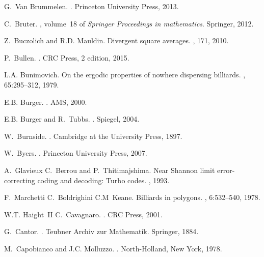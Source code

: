 \documentclass[12pt]{amsart}
\newcounter{example}    \def\example#1{ \item \fontsize{12}{15} \selectfont #1 \fontsize{12}{15} \selectfont }
\begin{document}
\begin{thebibliography}{100}
G.~Van Brummelen.
.
\newblock Princeton University Press, 2013.

C.~Bruter.
, volume~18 of {\em Springer
  Proceedings in mathematics}.
\newblock Springer, 2012.

Z.~Buczolich and R.D. Mauldin.
\newblock Divergent square averages.
, 171, 2010.

P.~Bullen.
.
\newblock CRC Press, 2 edition, 2015.

L.A. Bunimovich.
\newblock On the ergodic properties of nowhere dispersing billiards.
, 65:295--312, 1979.

E.B. Burger.
.
\newblock AMS, 2000.

E.B. Burger and R.~Tubbs.
.
\newblock Spiegel, 2004.

W.~Burnside.
.
\newblock Cambridge at the University Press, 1897.

W.~Byers.
.
\newblock Princeton University Press, 2007.

A.~Glavieux C.~Berrou and P.~Thitimajshima.
\newblock Near {Shannon} limit error-correcting coding and decoding: Turbo
  codes.
, 1993.

F.~Marchetti C.~Boldrighini C.M~Keane.
\newblock Billiards in polygons.
, 6:532--540, 1978.

W.T. Haight~II C.~Cavagnaro.
.
\newblock CRC Press, 2001.

G.~Cantor.
.
\newblock Teubner Archiv zur Mathematik. Springer, 1884.

M.~Capobianco and J.C. Molluzzo.
.
\newblock North-Holland, New York, 1978.


\end{thebibliography}
\end{document}
